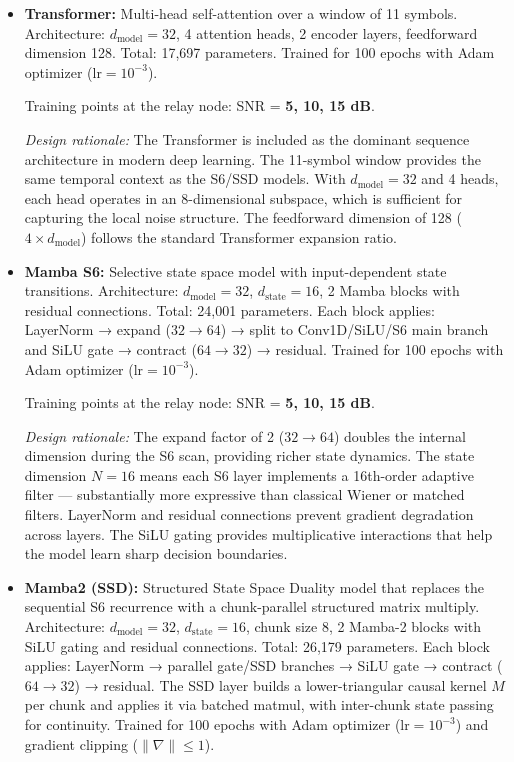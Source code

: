 \documentclass[
  english,
  12pt,
  12pt,
  a4paper,
  oneside]{report}
\begin{document}
\begin{itemize}
\item
  \textbf{Transformer:} Multi-head self-attention over a window of 11 symbols. Architecture: \(d_{\text{model}}=32\), 4 attention heads, 2 encoder layers, feedforward dimension 128. Total: 17,697 parameters. Trained for 100 epochs with Adam optimizer (\(\text{lr}=10^{-3}\)).

  Training points at the relay node: SNR = \textbf{5, 10, 15 dB}.

  \emph{Design rationale:} The Transformer is included as the dominant sequence architecture in modern deep learning. The 11-symbol window provides the same temporal context as the S6/SSD models. With \(d_{\text{model}} = 32\) and 4 heads, each head operates in an 8-dimensional subspace, which is sufficient for capturing the local noise structure. The feedforward dimension of 128 (\(4 \times d_{\text{model}}\)) follows the standard Transformer expansion ratio.
\item
  \textbf{Mamba S6:} Selective state space model with input-dependent state transitions. Architecture: \(d_{\text{model}}=32\), \(d_{\text{state}}=16\), 2 Mamba blocks with residual connections. Total: 24,001 parameters. Each block applies: LayerNorm → expand (\(32 \to 64\)) → split to Conv1D/SiLU/S6 main branch and SiLU gate → contract (\(64 \to 32\)) → residual. Trained for 100 epochs with Adam optimizer (\(\text{lr}=10^{-3}\)).

  Training points at the relay node: SNR = \textbf{5, 10, 15 dB}.

  \emph{Design rationale:} The expand factor of 2 (\(32 \to 64\)) doubles the internal dimension during the S6 scan, providing richer state dynamics. The state dimension \(N = 16\) means each S6 layer implements a 16th-order adaptive filter --- substantially more expressive than classical Wiener or matched filters. LayerNorm and residual connections prevent gradient degradation across layers. The SiLU gating provides multiplicative interactions that help the model learn sharp decision boundaries.
\item
  \textbf{Mamba2 (SSD):} Structured State Space Duality model that replaces the sequential S6 recurrence with a chunk-parallel structured matrix multiply. Architecture: \(d_{\text{model}}=32\), \(d_{\text{state}}=16\), chunk size 8, 2 Mamba-2 blocks with SiLU gating and residual connections. Total: 26,179 parameters. Each block applies: LayerNorm → parallel gate/SSD branches → SiLU gate → contract (\(64 \to 32\)) → residual. The SSD layer builds a lower-triangular causal kernel \(M\) per chunk and applies it via batched matmul, with inter-chunk state passing for continuity. Trained for 100 epochs with Adam optimizer (\(\text{lr}=10^{-3}\)) and gradient clipping (\(\|\nabla\| \le 1\)).


\end{itemize}
\end{document}
